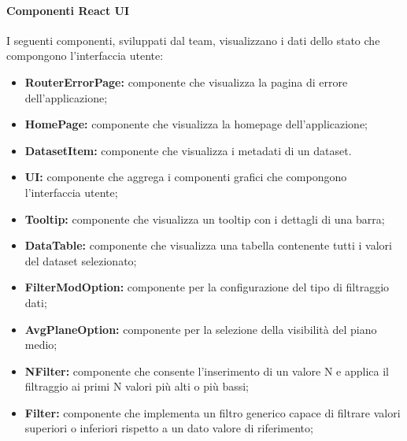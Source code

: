 \paragraph{Componenti React UI}
    I seguenti componenti, sviluppati dal team, visualizzano i dati dello stato che compongono l'interfaccia utente:
    \begin{itemize}
        \item \textbf{RouterErrorPage:} componente che visualizza la pagina di errore dell'applicazione;
        \item \textbf{HomePage:} componente che visualizza la homepage dell'applicazione;
        \item \textbf{DatasetItem:} componente che visualizza i metadati di un dataset.
        \item \textbf{UI:} componente che aggrega i componenti grafici che compongono l'interfaccia utente;
                \item \textbf{Tooltip:} componente che visualizza un tooltip con i dettagli di una barra;
        \item \textbf{DataTable:} componente che visualizza una tabella contenente tutti i valori del dataset selezionato;
        \item \textbf{FilterModOption:} componente per la configurazione del tipo di filtraggio dati;
        \item \textbf{AvgPlaneOption:} componente per la selezione della visibilità del piano medio;
        \item \textbf{NFilter:} componente che consente l'inserimento di un valore N e applica il filtraggio ai primi N valori più alti o più bassi;
        \item \textbf{Filter:} componente che implementa un filtro generico capace di filtrare valori superiori o inferiori rispetto a un dato valore di riferimento;
    \end{itemize}
